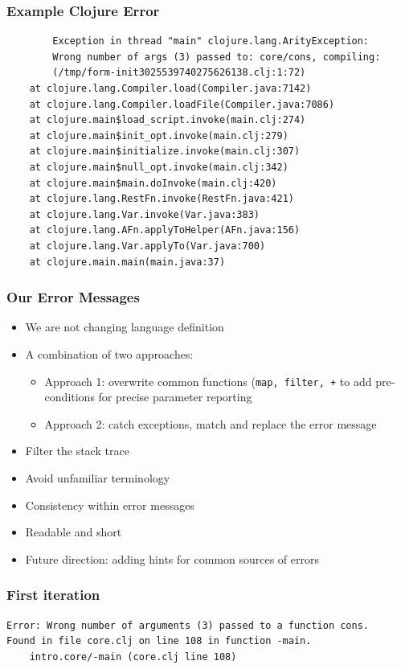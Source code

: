 \documentclass{beamer}
\begin{document}
\begin{frame}[fragile]
\frametitle{Example Clojure Error}
		\begin{verbatim}
		Exception in thread "main" clojure.lang.ArityException:
		Wrong number of args (3) passed to: core/cons, compiling:
		(/tmp/form-init3025539740275626138.clj:1:72)
	at clojure.lang.Compiler.load(Compiler.java:7142)
	at clojure.lang.Compiler.loadFile(Compiler.java:7086)
	at clojure.main$load_script.invoke(main.clj:274)
	at clojure.main$init_opt.invoke(main.clj:279)
	at clojure.main$initialize.invoke(main.clj:307)
	at clojure.main$null_opt.invoke(main.clj:342)
	at clojure.main$main.doInvoke(main.clj:420)
	at clojure.lang.RestFn.invoke(RestFn.java:421)
	at clojure.lang.Var.invoke(Var.java:383)
	at clojure.lang.AFn.applyToHelper(AFn.java:156)
	at clojure.lang.Var.applyTo(Var.java:700)
	at clojure.main.main(main.java:37)
		\end{verbatim}	
\end{frame}



\begin{frame}
	\frametitle{Our Error Messages}
	\begin{itemize}
		\item We are not changing language definition
		\item A combination of two approaches: 
		\begin{itemize}
		\item Approach 1: overwrite common functions ({\tt map, filter, +} to add pre-conditions for precise parameter reporting
		\item Approach 2: catch exceptions, match and replace the error message	
		\end{itemize}
		\item Filter the stack trace
		\item Avoid unfamiliar terminology
		\item Consistency within error messages
		\item Readable and short
		\item Future direction: adding hints for common sources of errors
	\end{itemize}
\end{frame}

\begin{frame}[fragile]
\frametitle{First iteration}
		\begin{verbatim}
Error: Wrong number of arguments (3) passed to a function cons.
Found in file core.clj on line 108 in function -main.
	intro.core/-main (core.clj line 108)
	\end{verbatim}	
\end{frame}
\end{document}
